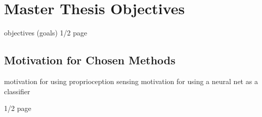 \chapter{Master Thesis Objectives}
\label{chapter:02:master_thesis_objectives}

objectives (goals) 
1/2 page

\section{Motivation for Chosen Methods}
motivation for using proprioception sensing
motivation for using a neural net as a classifier

1/2 page